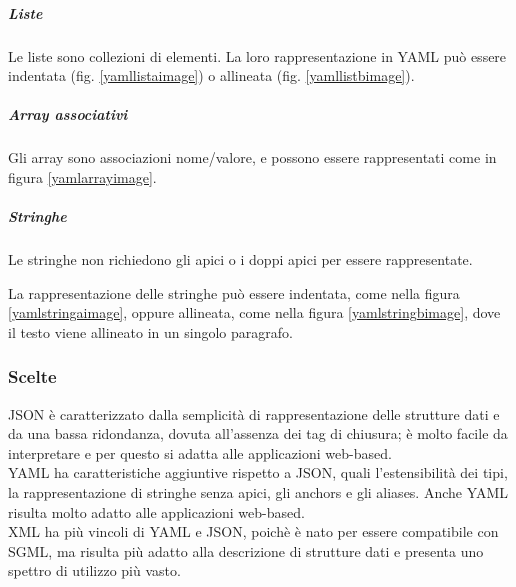 \subparagraph{Liste}
Le liste sono collezioni di elementi. La loro rappresentazione in YAML può essere indentata (fig. \ref{yamllistaimage}) o allineata (fig. \ref{yamllistbimage}).

\subparagraph{Array associativi}
Gli array sono associazioni nome/valore, e possono essere rappresentati come in figura \ref{yamlarrayimage}.

\subparagraph{Stringhe}
Le stringhe non richiedono gli apici o i doppi apici per essere rappresentate.

La rappresentazione delle stringhe può essere indentata, come nella figura \ref{yamlstringaimage}, oppure allineata, come nella figura \ref{yamlstringbimage}, dove il testo viene allineato in un singolo paragrafo.

\subsubsection{Scelte}
JSON è caratterizzato dalla semplicità di rappresentazione delle strutture dati e da una bassa ridondanza, dovuta all'assenza dei tag di chiusura; è molto facile da interpretare e per questo si adatta alle applicazioni web-based.\\

YAML ha caratteristiche aggiuntive rispetto a JSON, quali l'estensibilità dei tipi, la rappresentazione di stringhe senza apici, gli anchors e gli aliases. Anche YAML risulta molto adatto alle applicazioni web-based.\\
XML ha più vincoli di YAML e JSON, poichè è nato per essere compatibile con SGML, ma risulta più adatto alla descrizione di strutture dati e presenta uno spettro di utilizzo più vasto.

\clearpage{\pagestyle{empty}\cleardoublepage}


